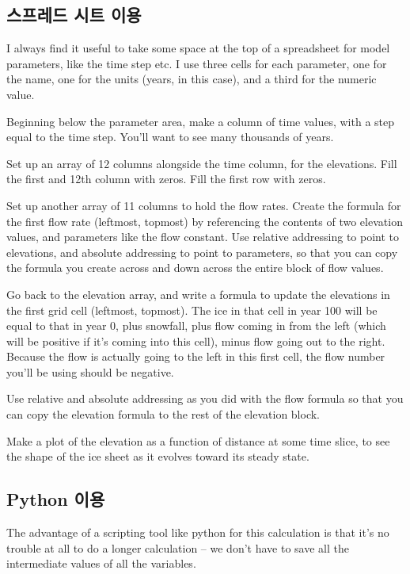 {\subsection{스프레드 시트 이용}\index{}

I always find it useful to take some space at the top of a spreadsheet for model parameters, like the time step etc. I use three cells for each parameter, one for the name, one for the units (years, in this case), and a third for the numeric value.

Beginning below the parameter area, make a column of time values, with a step equal to the time step. You'll want to see many thousands of years.

Set up an array of 12 columns alongside the time column, for the elevations. Fill the first and 12th column with zeros. Fill the first row with zeros.

Set up another array of 11 columns to hold the flow rates. Create the formula for the first flow rate (leftmost, topmost) by referencing the contents of two elevation values, and parameters like the flow constant. Use relative addressing to point to elevations, and absolute addressing to point to parameters, so that you can copy the formula you create across and down across the entire block of flow values.

Go back to the elevation array, and write a formula to update the elevations in the first grid cell (leftmost, topmost). The ice in that cell in year 100 will be equal to that in year 0, plus snowfall, plus flow coming in from the left (which will be positive if it's coming into this cell), minus flow going out to the right. Because the flow is actually going to the left in this first cell, the flow number you'll be using should be negative.

Use relative and absolute addressing as you did with the flow formula so that you can copy the elevation formula to the rest of the elevation block.

Make a plot of the elevation as a function of distance at some time slice, to see the shape of the ice sheet as it evolves toward its steady state.


\subsection{Python 이용}\index{}

The advantage of a scripting tool like python for this calculation is that it's no trouble at all to do a longer calculation -- we don't have to save all the intermediate values of all the variables.

}
